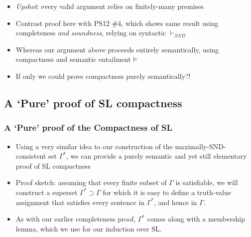 \begin{frame}
\begin{itemize}[<+->]
\item \textit{Upshot}: every valid argument relies on finitely-many premises

\item Contrast proof here with PS12 \#4, which shows same result using completeness \textit{and soundness}, relying on syntactic $\vdash_{SND}$

\item Whereas our argument above proceeds entirely semantically, using compactness and semantic entailment $\vDash$ 


\item If only we could prove compactness purely semantically?!

\end{itemize}
\end{frame}

\subsection{A `Pure' proof of SL compactness}

\begin{frame}
\frametitle{A `Pure' proof of the Compactness of SL}

\begin{itemize}[<+->]

\item Using a very similar idea to our construction of the maximally-SND-consistent set $\Gamma^{\ast}$, we can provide a purely semantic and yet still elementary proof of SL compactness

\item Proof sketch: assuming that every finite subset of $\Gamma$ is satisfiable, we will construct a superset $\Gamma^{\ast} \supset \Gamma$ for which it is easy to define a truth-value assignment that satisfies every sentence in $\Gamma^{\ast}$, and hence in $\Gamma$.

\item As with our earlier completeness proof, $\Gamma^{\ast}$ comes along with a membership lemma, which we use for our induction over SL. 

\end{itemize}
\end{frame}

